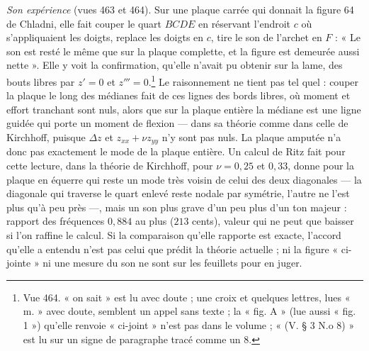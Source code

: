 \documentclass[11pt,a4paper]{article}
\begin{document}
\emph{Son expérience} (vues 463 et 464). Sur une plaque carrée qui donnait la figure 64
de Chladni, elle fait couper le quart $BCDE$ en réservant l'endroit $c$ où
s'appliquaient les doigts, replace les doigts en $c$, tire le son de l'archet en $F$ :
« Le son est resté le même que sur la plaque complette, et la figure est demeurée aussi
nette ». Elle y voit la confirmation, qu'elle n'avait pu obtenir sur la lame, des bouts
libres par $z' = 0$ et $z''' = 0$.\footnote{Vue 464. « on sait » est lu avec doute ;
une croix et quelques lettres, lues « m. » avec doute, semblent un appel sans texte ;
la « fig. A » (lue aussi « fig. 1 ») qu'elle renvoie « ci-joint » n'est pas dans le
volume ; « (V. § 3 N.o 8) » est lu sur un signe de paragraphe tracé comme un 8.} Le
raisonnement ne tient pas tel quel : couper la plaque le long des médianes fait de ces
lignes des bords libres, où moment et effort tranchant sont nuls, alors que sur la
plaque entière la médiane est une ligne guidée qui porte un moment de flexion — dans
sa théorie comme dans celle de Kirchhoff, puisque $\Delta z$ et
$z_{xx} + \nu z_{yy}$ n'y sont pas nuls. La plaque amputée n'a donc pas exactement le
mode de la plaque entière. Un calcul de Ritz fait pour cette lecture, dans la théorie de
Kirchhoff, pour $\nu = 0{,}25$ et $0{,}33$, donne pour la plaque en équerre qui reste
un mode très voisin de celui des deux diagonales — la diagonale qui traverse le quart
enlevé reste nodale par symétrie, l'autre ne l'est plus qu'à peu près —, mais un son
plus grave d'un peu plus d'un ton majeur : rapport des fréquences $0{,}884$ au plus
($213$ cents), valeur qui ne peut que baisser si l'on raffine le calcul. Si la
comparaison qu'elle rapporte est exacte, l'accord qu'elle a entendu n'est pas celui
que prédit la théorie actuelle ; ni la figure « ci-jointe » ni une mesure du son ne
sont sur les feuillets pour en juger.
\end{document}
